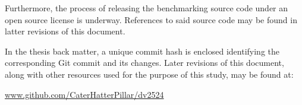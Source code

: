 Furthermore, the process of releasing the benchmarking source code under an open source license is underway.
References to said source code may be found in latter revisions of this document.

In the thesis back matter, a unique commit hash is enclosed identifying the corresponding Git commit and its changes.
Later revisions of this document, along with other resources used for the purpose of this study, may be found at:
\begin{center}
\href{https://github.com/CaterHatterPillar/dv2524}{www.github.com/CaterHatterPillar/dv2524}
\end{center}
